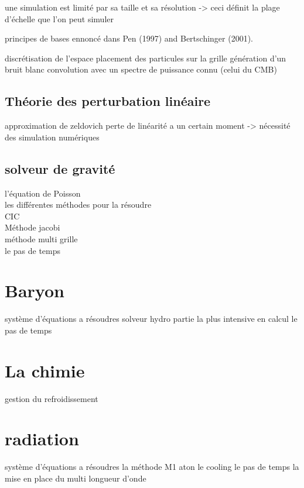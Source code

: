 une simulation est limité par sa taille et sa résolution -> ceci définit la plage d'échelle que l'on peut simuler

principes de bases ennoncé dans Pen (1997) and Bertschinger (2001).

    discrétisation de l'espace
    placement des particules sur la grille
    génération d'un bruit blanc
    convolution avec un spectre de puissance connu (celui du CMB)


\subsection{Théorie des perturbation linéaire}

approximation de zeldovich
perte de linéarité a un certain moment -> nécessité des simulation numériques





\subsection{solveur de gravité}

l'équation de Poisson \\
les différentes méthodes pour la résoudre\\
CIC\\
Méthode jacobi\\
méthode multi grille\\
le pas de temps\\

\section{Baryon}

système d'équations a résoudres
solveur hydro
partie la plus intensive en calcul
le pas de temps

\section{La chimie}

gestion du refroidissement

\section{radiation}

système d'équations a résoudres
la méthode M1
aton
le cooling
le pas de temps
la mise en place du multi longueur d'onde

